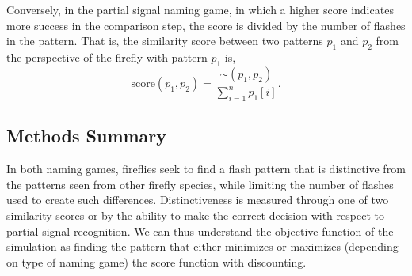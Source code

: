 Conversely, in the partial signal naming game, in which a higher score indicates more success in the comparison step, the score is divided by the number of flashes in the pattern. That is, the similarity score between two patterns $p_1$ and $p_2$ from the perspective of the firefly with pattern $p_1$ is, \[ \textrm{score}(p_1, p_2) = \frac{\sim(p_1, p_2)}{\sum_{i = 1}^{n} p_1[i]}. \]




\subsection{Methods Summary}
In both naming games, fireflies seek to find a flash pattern that is distinctive from the patterns seen from other firefly species, while limiting the number of flashes used to create such differences.
Distinctiveness is measured through one of two similarity scores or by the ability to make the correct decision with respect to partial signal recognition.
We can thus understand the objective function of the simulation as finding the pattern that either minimizes or maximizes (depending on type of naming game) the score function with discounting. 
